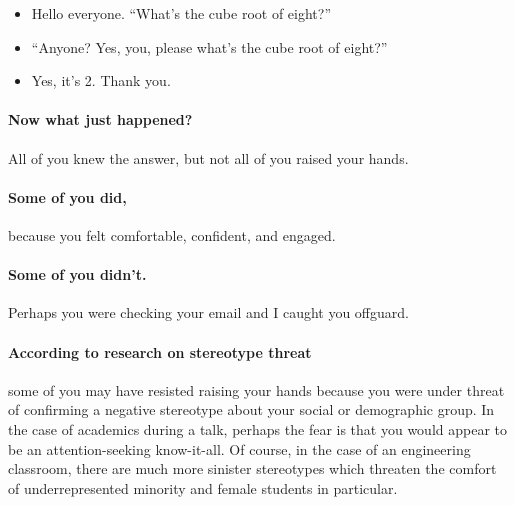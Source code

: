 \documentclass[11pt]{article}
\makeatletter
\newcommand{\authorname}{Kathryn~D.~Huff }
\newcommand{\authoremail}{katyhuff@illinois.edu}
\newcommand{\authorsite}{arfc.npre.illinois.edu}
\makeatother
\begin{document}
\pagestyle{fancy}
          \lhead{\textcolor{gray}{Prof. \authorname\\\authoremail}}
          \rhead{\textcolor{gray}{Academy for Excellence in Engineering 
          Education}}
          \renewcommand{\headrulewidth}{0pt}
          \renewcommand{\footrulewidth}{0pt}
          \fancyfoot[C]{\footnotesize \textcolor{gray}{\authorsite}}

          \begin{itemize}
                  \item Hello everyone. ``What's the cube root of eight?''
                  \item ``Anyone? Yes, you, please what's the cube root of eight?'' 
                  \item Yes, it's 2. Thank you. 
          \end{itemize} 

          \paragraph{Now what just happened?}

          All of you knew the answer, but not all of you raised your hands.
          \paragraph{Some of you did,} because you felt comfortable, confident, 
          and engaged. 
          \paragraph{Some of you didn't.} Perhaps you were checking your email 
          and I caught you offguard.
          \paragraph{According to research on stereotype threat} some of you 
          may have resisted raising your hands because you were under threat of 
          confirming a negative stereotype about your social or demographic group. 
          In the case of academics during a talk, perhaps the fear is that you 
          would appear to be an attention-seeking know-it-all. Of course, in 
          the case of an engineering classroom, there are much more sinister 
          stereotypes which threaten the comfort of underrepresented minority 
          and female students in particular.
\end{document}
